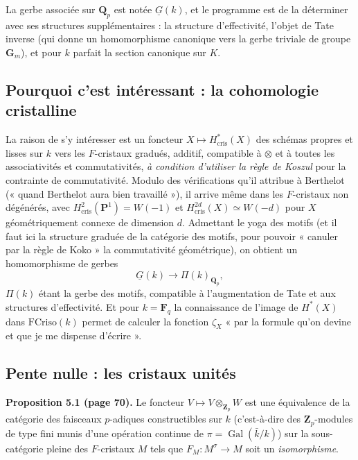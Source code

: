\documentclass[11pt,a4paper]{article}
\begin{document}
La gerbe associée sur $\mathbf{Q}_{p}$ est notée $\underline{G}(k)$, et le
programme est de la déterminer avec ses structures supplémentaires : la
structure d'effectivité, l'objet de Tate inverse (qui donne un homomorphisme
canonique vers la gerbe triviale de groupe $\mathbf{G}_{m}$), et pour $k$
parfait la section canonique sur $K$.

\subsection*{Pourquoi c'est intéressant : la cohomologie cristalline}

La raison de s'y intéresser est un foncteur $X \mapsto H^{*}_{\mathrm{cris}}(X)$
des schémas propres et lisses sur $k$ vers les $F$-cristaux gradués, additif,
compatible à $\otimes$ et à toutes les associativités et commutativités,
\emph{à condition d'utiliser la règle de Koszul} pour la contrainte de
commutativité. Modulo des vérifications qu'il attribue à Berthelot (« quand
Berthelot aura bien travaillé »), il arrive même dans les $F$-cristaux non
dégénérés, avec $H^{2}_{\mathrm{cris}}(\mathbf{P}^{1}) = W(-1)$ et
$H^{2d}_{\mathrm{cris}}(X) \simeq W(-d)$ pour $X$ géométriquement connexe de
dimension $d$. Admettant le yoga des motifs (et il faut ici la structure
graduée de la catégorie des motifs, pour pouvoir « canuler par la règle de
Koko » la commutativité géométrique), on obtient un homomorphisme de gerbes
\[
\underline{G}(k) \longrightarrow \Pi(k)_{\mathbf{Q}_{p}} ,
\]
$\Pi(k)$ étant la gerbe des motifs, compatible à l'augmentation de Tate et aux
structures d'effectivité. Et pour $k = \mathbf{F}_{q}$ la connaissance de
l'image de $H^{*}(X)$ dans $\mathrm{FCriso}(k)$ permet de calculer la fonction
$\zeta_{X}$ « par la formule qu'on devine et que je me dispense d'écrire ».

\subsection*{Pente nulle : les cristaux unités}

\textbf{Proposition 5.1 (page 70).} Le foncteur $V \mapsto V
\otimes_{\mathbf{Z}_{p}} W$ est une équivalence de la catégorie des faisceaux
$p$-adiques constructibles sur $k$ (c'est-à-dire des
$\mathbf{Z}_{p}$-modules de type fini munis d'une opération continue de
$\pi = \operatorname{Gal}(\bar{k}/k)$) sur la sous-catégorie pleine des
$F$-cristaux $M$ tels que $F_{M} \colon M^{\sigma} \to M$ soit un
\emph{isomorphisme}.
\end{document}
